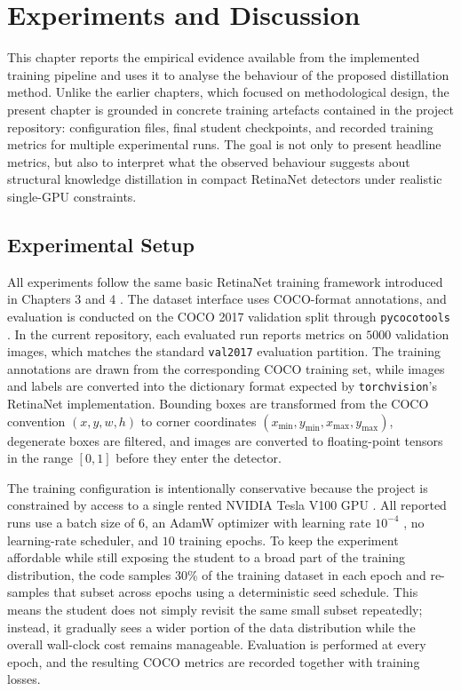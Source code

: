 \chapter{Experiments and Discussion}

This chapter reports the empirical evidence available from the implemented training pipeline and uses it to analyse the behaviour of the proposed distillation method. Unlike the earlier chapters, which focused on methodological design, the present chapter is grounded in concrete training artefacts contained in the project repository: configuration files, final student checkpoints, and recorded training metrics for multiple experimental runs. The goal is not only to present headline metrics, but also to interpret what the observed behaviour suggests about structural knowledge distillation in compact RetinaNet detectors under realistic single-GPU constraints.

\section{Experimental Setup}

All experiments follow the same basic RetinaNet training framework introduced in Chapters 3 and 4 \cite{lin2017focal}. The dataset interface uses COCO-format annotations, and evaluation is conducted on the COCO 2017 validation split through \texttt{pycocotools} \cite{lin2014coco}. In the current repository, each evaluated run reports metrics on $5000$ validation images, which matches the standard \texttt{val2017} evaluation partition. The training annotations are drawn from the corresponding COCO training set, while images and labels are converted into the dictionary format expected by \texttt{torchvision}'s RetinaNet implementation. Bounding boxes are transformed from the COCO convention $(x,y,w,h)$ to corner coordinates $(x_{\min},y_{\min},x_{\max},y_{\max})$, degenerate boxes are filtered, and images are converted to floating-point tensors in the range $[0,1]$ before they enter the detector.

The training configuration is intentionally conservative because the project is constrained by access to a single rented NVIDIA Tesla V100 GPU \cite{nvidia2017v100}. All reported runs use a batch size of $6$, an AdamW optimizer with learning rate $10^{-4}$ \cite{loshchilov2019adamw}, no learning-rate scheduler, and $10$ training epochs. To keep the experiment affordable while still exposing the student to a broad part of the training distribution, the code samples $30\%$ of the training dataset in each epoch and re-samples that subset across epochs using a deterministic seed schedule. This means the student does not simply revisit the same small subset repeatedly; instead, it gradually sees a wider portion of the data distribution while the overall wall-clock cost remains manageable. Evaluation is performed at every epoch, and the resulting COCO metrics are recorded together with training losses.

